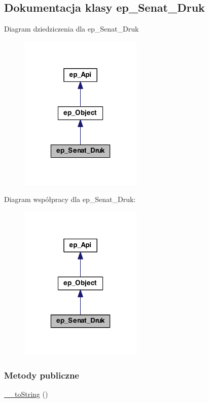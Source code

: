 \hypertarget{classep___senat___druk}{\subsection{Dokumentacja klasy ep\-\_\-\-Senat\-\_\-\-Druk}
\label{classep___senat___druk}
}


Diagram dziedziczenia dla ep\-\_\-\-Senat\-\_\-\-Druk\nopagebreak
\begin{figure}[H]
\begin{center}
\leavevmode
\includegraphics[width=166pt]{classep___senat___druk__inherit__graph}
\end{center}
\end{figure}


Diagram współpracy dla ep\-\_\-\-Senat\-\_\-\-Druk\-:\nopagebreak
\begin{figure}[H]
\begin{center}
\leavevmode
\includegraphics[width=166pt]{classep___senat___druk__coll__graph}
\end{center}
\end{figure}
\subsubsection*{Metody publiczne}
\begin{DoxyCompactItemize}
\item 
\hyperlink{classep___senat___druk_a7516ca30af0db3cdbf9a7739b48ce91d}{\-\_\-\-\_\-to\-String} ()
\end{DoxyCompactItemize}
